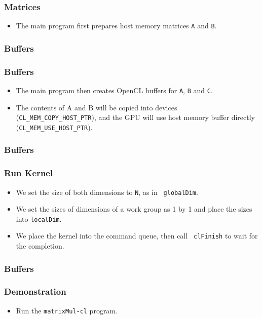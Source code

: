 \documentclass{beamer}
\begin{document}
\begin{frame}
  \frametitle{Matrices}
  \begin{itemize}
    \item The main program first prepares host memory matrices {\tt A}
      and {\tt B}.
  \end{itemize}
\end{frame}

\begin{frame}
  \frametitle{Buffers}
\end{frame}

\begin{frame}
  \frametitle{Buffers}
  \begin{itemize}
    \item The main program then creates OpenCL buffers for {\tt A},
      {\tt B} and {\tt C}.
    \item The contents of A and B will be copied into devices
      ({\tt CL\_MEM\_COPY\_HOST\_PTR}), and the GPU will use host memory buffer
      directly ({\tt CL\_MEM\_USE\_HOST\_PTR}).
  \end{itemize}
\end{frame}

\begin{frame}
  \frametitle{Buffers}
\end{frame}

\begin{frame}
  \frametitle{Run Kernel}
  \begin{itemize}
  \item We set the size of both dimensions to {\tt N}, as in {\tt
    globalDim}.
  \item We set the sizes of dimensions of a work group as 1 by 1 and
    place the sizes into {\tt localDim}.
  \item We place the kernel into the command queue, then call {\tt
    clFinish} to wait for the completion.
  \end{itemize}
\end{frame}

\begin{frame}
  \frametitle{Buffers}
\end{frame}



\begin{frame}
  \frametitle{Demonstration}
  \begin{itemize}
    \item Run the {\tt matrixMul-cl} program.
  \end{itemize}
\end{frame}
\end{document}
